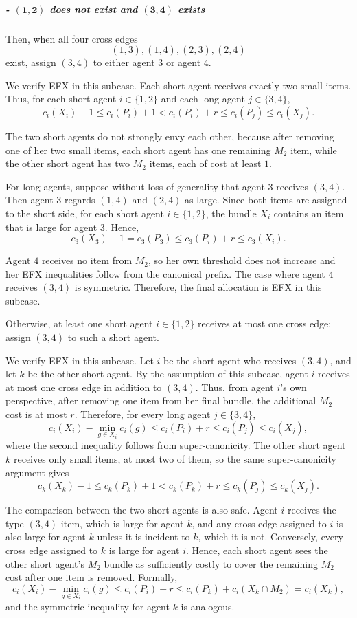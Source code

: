 \documentclass{article}
\theoremstyle{definition}
\begin{document}
\subparagraph{- $\boldsymbol{(1,2)}$ does not exist and $\boldsymbol{(3,4)}$ exists} Then, when all four cross edges
\[
    (1,3),(1,4),(2,3),(2,4)
\]
exist, assign $(3,4)$ to either agent $3$ or agent $4$.

We verify EFX in this subcase.  Each short agent receives exactly two small
items.  Thus, for each short agent $i\in\{1,2\}$ and each long agent
$j\in\{3,4\}$,
\[
    c_i(X_i)-1
    \le c_i(P_i)+1
    < c_i(P_i)+r
    \le c_i(P_j)
    \le c_i(X_j).
\]

The two short agents do not strongly envy each other, because after removing
one of her two small items, each short agent has one remaining $M_2$ item,
while the other short agent has two $M_2$ items, each of cost at least $1$.

For long agents, suppose without loss of generality that agent $3$ receives
$(3,4)$.  Then agent $3$ regards $(1,4)$ and $(2,4)$ as large.  Since both
items are assigned to the short side, for each short agent $i\in\{1,2\}$,
the bundle $X_i$ contains an item that is large for agent $3$.  Hence,
\[
    c_3(X_3)-1
    =c_3(P_3)
    \le c_3(P_i)+r
    \le c_3(X_i).
\]

Agent $4$ receives no item from $M_2$, so her own threshold does not increase
and her EFX inequalities follow from the canonical prefix.  The case where
agent $4$ receives $(3,4)$ is symmetric.  Therefore, the final allocation is
EFX in this subcase.

Otherwise, at least one short agent $i\in\{1,2\}$ receives at most one cross
edge; assign $(3,4)$ to such a short agent.

We verify EFX in this subcase.  Let $i$ be the short agent who receives
$(3,4)$, and let $k$ be the other short agent.  By the assumption of this
subcase, agent $i$ receives at most one cross edge in addition to $(3,4)$.
Thus, from agent $i$'s own perspective, after removing one item from her
final bundle, the additional $M_2$ cost is at most $r$.  Therefore, for every
long agent $j\in\{3,4\}$,
\[
    c_i(X_i)-\min_{g\in X_i}c_i(g)
    \le c_i(P_i)+r
    \le c_i(P_j)
    \le c_i(X_j),
\]
where the second inequality follows from super-canonicity.  The other short
agent $k$ receives only small items, at most two of them, so the same
super-canonicity argument gives
\[
    c_k(X_k)-1
    \le c_k(P_k)+1
    < c_k(P_k)+r
    \le c_k(P_j)
    \le c_k(X_j).
\]

The comparison between the two short agents is also safe.  Agent $i$ receives
the type-$(3,4)$ item, which is large for agent $k$, and any cross edge
assigned to $i$ is also large for agent $k$ unless it is incident to $k$,
which it is not.  Conversely, every cross edge assigned to $k$ is large for
agent $i$.  Hence, each short agent sees the other short agent's $M_2$ bundle
as sufficiently costly to cover the remaining $M_2$ cost after one item is
removed.  Formally,
\[
    c_i(X_i)-\min_{g\in X_i}c_i(g)
    \le c_i(P_i)+r
    \le c_i(P_k)+c_i(X_k\cap M_2)
    =c_i(X_k),
\]
and the symmetric inequality for agent $k$ is analogous.
\end{document}
